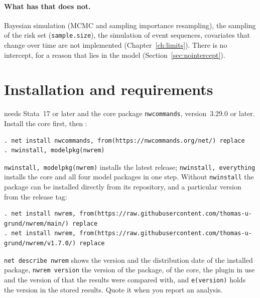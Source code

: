 \paragraph{What \relevent{} has that \nwrem{} does not.} Bayesian simulation (MCMC and sampling importance resampling), the sampling of the risk set (\texttt{sample.size}), the simulation of event sequences, covariates that change over time are not implemented (Chapter~\ref{ch:limits}). There is no intercept, for a reason that lies in the model (Section~\ref{sec:nointercept}).

\section{Installation and requirements}\label{sec:install}

\nwrem{} needs Stata~17 or later and the core package \texttt{nwcommands}, version~3.29.0 or later. Install the core first, then \nwrem{}:
\begin{lstlisting}
. net install nwcommands, from(https://nwcommands.org/net/) replace
. nwinstall, modelpkg(nwrem)
\end{lstlisting}
\texttt{nwinstall, modelpkg(nwrem)} installs the latest release; \texttt{nwinstall, everything} installs the core and all four model packages in one step. Without \texttt{nwinstall} the package can be installed directly from its repository, and a particular version from the release tag:
\begin{lstlisting}
. net install nwrem, from(https://raw.githubusercontent.com/thomas-u-grund/nwrem/main/) replace
. net install nwrem, from(https://raw.githubusercontent.com/thomas-u-grund/nwrem/v1.7.0/) replace
\end{lstlisting}
\texttt{net describe nwrem} shows the version and the distribution date of the installed package, \texttt{nwrem version} the version of the package, of the core, the plugin in use and the version of \relevent{} that the results were compared with, and \texttt{e(version)} holds the version in the stored results. Quote it when you report an analysis.

